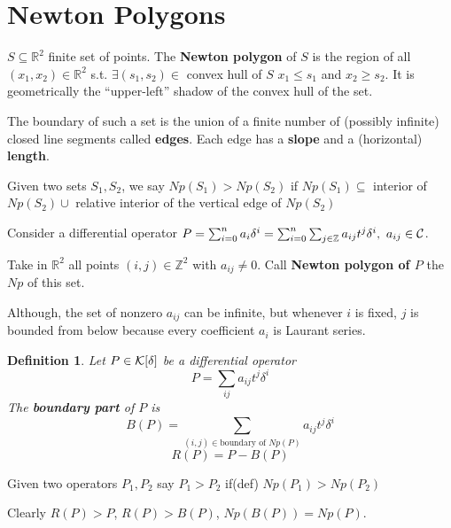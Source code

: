 \documentclass[11pt]{article}
\newtheorem{dfn}[thm]{Definition}
\newcommand{\reals}{\mathbb R}
\newcommand{\intg}{\mathbb Z}
\newcommand{\calc}{{\cal C}}
\newcommand{\calk}{{\cal K}}
\begin{document}
\section{Newton Polygons}
$S\subseteq \reals^2$ finite set of points. The \textbf{Newton polygon} of $S$ is the region of all $(x_1,x_2)\in\reals^2$ s.t. $\exists (s_1, s_2)\in$ convex hull of $S$ $x_1\leq s_1$ and $ x_2\geq s_2$. It is geometrically 
the ``upper-left'' shadow of the convex hull of the set.

The boundary of such a set is the union of a finite number of (possibly infinite) closed line segments called \textbf{edges}. Each edge has a \textbf{slope} and a (horizontal) \textbf{length}.

Given two sets $S_1,S_2$, we say $Np(S_1)>Np(S_2)$ if $Np(S_1)\subseteq $ interior of $Np(S_2)\cup$ relative interior of the vertical edge of $Np(S_2)$


Consider a differential operator
$P=\sum^n_{i=0}a_i\delta^i=\sum^n_{i=0}\sum_{j\in \intg}a_{ij}t^j\delta^i,\ a_{ij}\in\calc$.

Take in $\reals^2$ all points $(i,j)\in \intg^2$ with $a_{ij}\neq 0$. Call \textbf{Newton polygon of $P$} the $Np$ of this set.

Although, the set of nonzero $a_{ij}$ can be infinite, but whenever $i$ is fixed, $j$ is bounded from below because every coefficient $a_i$ is Laurant series.

\begin{dfn}
Let $P\in \calk[\delta]$ be a differential operator
$$
P=\sum_{ij}a_{ij}t^j\delta^i
$$
The \textbf{boundary part} of $P$ is 
$$
B(P)=\sum_{(i,j) \in \text{boundary of } Np(P)} a_{ij}t^j\delta^i
$$ 
$$
R(P)=P-B(P)
$$
\end{dfn}
Given two operators $P_1,P_2$ say $P_1>P_2$ if(def) $Np(P_1)>Np(P_2)$

Clearly
$R(P)>P$, $R(P)>B(P)$, $Np(B(P))=Np(P)$.
\end{document}
